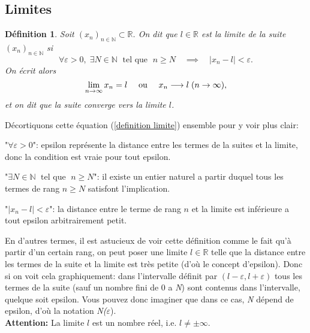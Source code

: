 \documentclass[a4paper, 12pt, french, twoside]{article}
\newtheorem{defi}[theorem]{Définition}
\newcommand{\Nn}{{\mathbb{N}}}
\newcommand{\Rr}{{\mathbb{R}}}
\begin{document}
\subsection{Limites}
\begin{defi}
Soit $(x_n)_{n\in\Nn}\subset \Rr$. On dit que $l\in \Rr$ est la \textit{limite} de la suite  $(x_n)_{n\in\Nn}$ si 
\begin{equation}\label{definition limite}
    \forall \varepsilon>0, \; \exists N\in\Nn \; \text{ tel que } \; n\geq N \quad \implies \quad |x_n-l|<\varepsilon.
\end{equation}
On écrit alors 
\begin{equation*}
    \lim_{n\to\infty} x_n= l \text{ \quad ou \quad } x_n\longrightarrow l \; (n \rightarrow \infty),
\end{equation*}
et on dit que la suite \textit{converge} vers la limite $l$.     
\end{defi}
Décortiquons cette équation (\ref{definition limite}) ensemble pour y voir plus clair: 

"$\forall \varepsilon>0$": epsilon représente la distance entre les termes de la suites et la limite, donc la condition est vraie pour tout epsilon.

"$\exists N\in\Nn \; \text{ tel que } \; n\geq N$": il existe un entier naturel a partir duquel tous les termes de rang $n\geq N$ satisfont l'implication.

"$|x_n-l|<\varepsilon$": la distance entre le terme de rang $n$ et la limite est inférieure a tout epsilon arbitrairement petit.

En d'autres termes, il est astucieux de voir cette définition comme le fait qu'à partir d'un certain rang, on peut poser une limite $l\in\Rr$ telle que la distance entre les termes de la suite et la limite est très petite (d'où le concept d'epsilon).
Donc si on voit cela graphiquement: dans l'intervalle définit par $(l-\varepsilon,l+\varepsilon)$ tous les termes de la suite (sauf un nombre fini de 0 a \textit{N}) sont contenus dans l'intervalle, quelque soit epsilon.
Vous pouvez donc imaginer que dans ce cas, \textit{N} dépend de epsilon, d'où la notation \textit{N(}$\varepsilon$).
\\\textbf{Attention: } La limite $l$ est un nombre réel, i.e. $l\neq\pm\infty$. 
\end{document}
